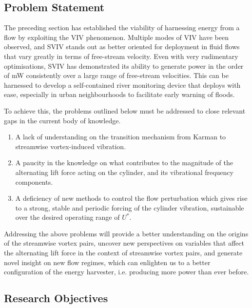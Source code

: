 \documentclass[]{article}
\begin{document}
\hypertarget{problem-statement}{\subsection{Problem
Statement}\label{problem-statement}}

The preceding section has established the viability of harnessing energy
from a flow by exploiting the VIV phenomenon. Multiple modes of VIV have
been observed, and SVIV stands out as better oriented for deployment in
fluid flows that vary greatly in terms of free-stream velocity. Even
with very rudimentary optimisations, SVIV has demonstrated its ability
to generate power in the order of mW consistently over a large range of
free-stream velocities. This can be harnessed to develop a
self-contained river monitoring device that deploys with ease,
especially in urban neighbourhoods to facilitate early warning of
floods.

To achieve this, the problems outlined below must be addressed to close
relevant gaps in the current body of knowledge.

\begin{enumerate}
\def\labelenumi{\roman{enumi})}
\item
  A lack of understanding on the transition mechanism from Karman to
  streamwise vortex-induced vibration.
\item
  A paucity in the knowledge on what contributes to the magnitude of the
  alternating lift force acting on the cylinder, and its vibrational
  frequency components.
\item
  A deficiency of new methods to control the flow perturbation which
  gives rise to a strong, stable and periodic forcing of the cylinder
  vibration, sustainable over the desired operating range of \(U^{*}\).
\end{enumerate}

Addressing the above problems will provide a better understanding on the
origins of the streamwise vortex pairs, uncover new perspectives on
variables that affect the alternating lift force in the context of
streamwise vortex pairs, and generate novel insight on new flow regimes,
which can enlighten us to a better configuration of the energy
harvester, i.e. producing more power than ever before.

\hypertarget{research-objectives}{\subsection{Research
Objectives}\label{research-objectives}}
\end{document}
